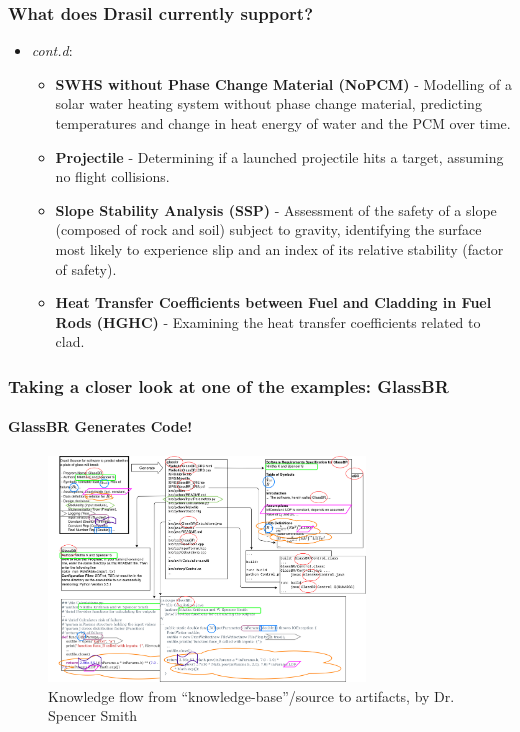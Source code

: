 \documentclass{beamer}
\begin{document}
\begin{frame}
    \frametitle{What does Drasil currently support?}
    \begin{itemize}
        \item<1-> \emph{cont.d}\footnotemark[1]:
            \begin{itemize}
                \item<1-> \textbf{SWHS without Phase Change Material (NoPCM)} - Modelling of a solar water heating system without phase change material, predicting temperatures and change in heat energy of water and the PCM over time.
                \item<2-> \textbf{Projectile} - Determining if a launched projectile hits a target, assuming no flight collisions.
                \item<3-> \textbf{Slope Stability Analysis (SSP)} - Assessment of the safety of a slope (composed of rock and soil) subject to gravity, identifying the surface most likely to experience slip and an index of its relative stability (factor of safety).
                \item<4-> \textbf{Heat Transfer Coefficients between Fuel and Cladding in Fuel Rods (HGHC)} - Examining the heat transfer coefficients related to clad.
            \end{itemize}
    \end{itemize}


\end{frame}

\begin{frame}
    \frametitle{Taking a closer look at one of the examples: GlassBR}
    \framesubtitle{GlassBR Generates Code!}
    \begin{figure}
        \center
        \includegraphics[width=0.75\textwidth]{assets/DrasilSupportsChange.png}
        \caption{Knowledge flow from ``knowledge-base''/source to artifacts, by Dr. Spencer Smith}
        \label{fig:glassbr}
    \end{figure}
\end{frame}
\end{document}
